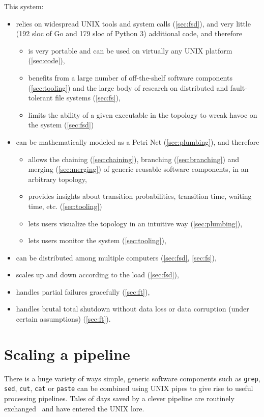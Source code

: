 \documentclass[letterpaper,twocolumn,10pt]{article}
\begin{document}
This system:
\begin{itemize}
\item relies on widespread UNIX tools and system calls (\autoref{sec:fsd}), and very little (192 sloc of Go and 179 sloc of Python 3) additional code, and therefore
\begin{itemize}
\item is very portable and can be used on virtually any UNIX platform (\autoref{sec:code}),
\item benefits from a large number of off-the-shelf software components (\autoref{sec:tooling}) and the large body of research on distributed and fault-tolerant file systems (\autoref{sec:fs}),
\item limits the ability of a given executable in the topology to wreak havoc on the system (\autoref{sec:fsd})
\end{itemize}
\item can be mathematically modeled as a Petri Net (\autoref{sec:plumbing}), and therefore
\begin{itemize}
\item allows the chaining (\autoref{sec:chaining}), branching (\autoref{sec:branching}) and merging (\autoref{sec:merging}) of generic reusable software components, in an arbitrary topology,
\item provides insights about transition probabilities, transition time, waiting time, etc. (\autoref{sec:tooling})
\item lets users visualize the topology in an intuitive way (\autoref{sec:plumbing}),
\item lets users monitor the system (\autoref{sec:tooling}),
\end{itemize}
\item can be distributed among multiple computers (\autoref{sec:fsd}, \ref{sec:fs}),
\item scales up and down according to the load (\autoref{sec:fsd}),
\item handles partial failures gracefully (\autoref{sec:ft}),
\item handles brutal total shutdown without data loss or data corruption (under certain assumptions) (\autoref{sec:ft}).
\end{itemize}
\section{Scaling a pipeline}

There is a huge variety of ways simple, generic software components such as {\tt grep}, {\tt sed}, {\tt cut}, {\tt cat} or {\tt paste} can be combined using UNIX pipes to give rise to useful processing pipelines. Tales of days saved by a clever pipeline are routinely exchanged~\cite{ddos,ping} and have entered the UNIX lore.
\end{document}

